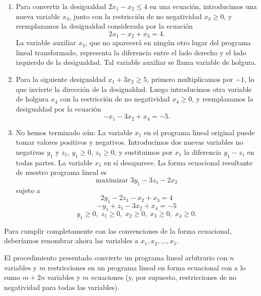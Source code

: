 \documentclass{article}
\begin{document}
\begin{enumerate}
    \item Para convertir la desigualdad \( 2x_1 - x_2 \leq 4 \) en una ecuación, introducimos una nueva variable \( x_3 \), junto con la restricción de no negatividad \( x_3 \geq 0 \), y reemplazamos la desigualdad considerada por la ecuación
    \[
    2x_1 - x_2 + x_3 = 4.
    \]
    La variable auxiliar \( x_3 \), que no aparecerá en ningún otro lugar del programa lineal transformado, representa la diferencia entre el lado derecho y el lado izquierdo de la desigualdad. Tal variable auxiliar se llama variable de holgura.

    \item Para la siguiente desigualdad \( x_1 + 3x_2 \geq 5 \), primero multiplicamos por \(-1\), lo que invierte la dirección de la desigualdad. Luego introducimos otra variable de holgura \( x_4 \) con la restricción de no negatividad \( x_4 \geq 0 \), y reemplazamos la desigualdad por la ecuación
    \[
    -x_1 - 3x_2 + x_4 = -5.
    \]

    \item No hemos terminado aún: La variable \( x_1 \) en el programa lineal original puede tomar valores positivos y negativos. Introducimos dos nuevas variables no negativas \( y_1 \) y \( z_1 \), \( y_1 \geq 0 \), \( z_1 \geq 0 \), y sustituimos por \( x_1 \) la diferencia \( y_1 - z_1 \) en todas partes. La variable \( x_1 \) en sí desaparece. La forma ecuacional resultante de nuestro programa lineal es
    \[
    \text{maximizar } 3y_1 - 3z_1 - 2x_2
    \]
    sujeto a
    \[
    2y_1 - 2z_1 - x_2 + x_3 = 4
    \]
    \[
    -y_1 + z_1 - 3x_2 + x_4 = -5
    \]
    \[
    y_1 \geq 0, \; z_1 \geq 0, \; x_2 \geq 0, \; x_3 \geq 0, \; x_4 \geq 0.
    \]
\end{enumerate}

    Para cumplir completamente con las convenciones de la forma ecuacional, deberíamos renombrar ahora las variables a \( x_1, x_2, \ldots, x_5 \).

    El procedimiento presentado convierte un programa lineal arbitrario con \( n \) variables y \( m \) restricciones en un programa lineal en forma ecuacional con a lo sumo \( m + 2n \) variables y \( m \) ecuaciones (y, por supuesto, restricciones de no negatividad para todas las variables).
\end{document}
